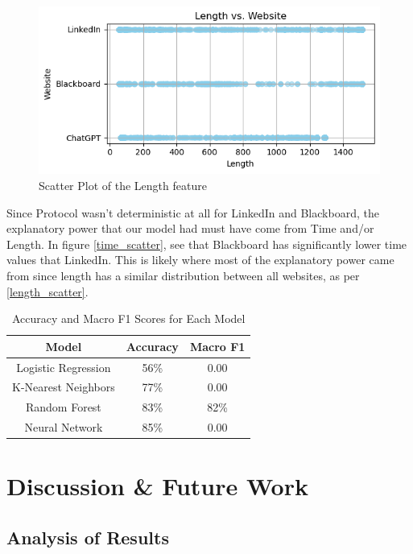 \documentclass[10pt,sigconf,letterpaper,nonacm]{acmart}
\begin{document}
\begin{figure}
    \centering
    \includegraphics[width=1\linewidth]{Figures_and_Graphs/length_scatter.png}
    \caption{Scatter Plot of the Length feature}
    \label{fig:length_scatter}
\end{figure}

Since Protocol wasn't deterministic at all for LinkedIn and Blackboard, the explanatory power that our model had must have come from Time and/or Length. In figure \ref{time_scatter}, see that Blackboard has significantly lower time values that LinkedIn. 
This is likely where most of the explanatory power came from since length has a similar distribution between all websites, as per \ref{length_scatter}.




  \begin{table}[!h]
    \begin{center}
    \caption{Accuracy and Macro F1 Scores for Each Model}
    \label{tab:results}
    \begin{tabular}{|c|c|c|}
      \hline
      Model & Accuracy & Macro F1 \\
      \hline
      Logistic Regression & 56\% & 0.00 \\
      K-Nearest Neighbors & 77\% & 0.00 \\
      Random Forest & 83\% & 82\% \\
      Neural Network & 85\% & 0.00 \\
      \hline
    \end{tabular}
    \end{center}
  \end{table}

\section{Discussion \& Future Work}
\subsection{Analysis of Results}
\end{document}
